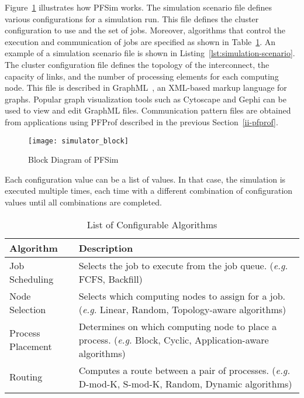 Figure~\ref{fig:simulator-block} illustrates how PFSim works. The
simulation scenario file defines various configurations for a simulation
run. This file defines the cluster configuration to use and the set of
jobs. Moreover, algorithms that control the execution and communication
of jobs are specified as shown in Table~\ref{tbl:simulator-algorithm}.
An example of a simulation scenario file is shown in
Listing~\ref{lst:simulation-scenario}. The cluster configuration file
defines the topology of the interconnect, the capacity of links, and the
number of processing elements for each computing node. This file is
described in GraphML~\autocite{Brandes2013}, an XML-based markup
language for graphs. Popular graph visualization tools such as Cytoscape
and Gephi can be used to view and edit GraphML files. Communication
pattern files are obtained from applications using PFProf described in
the previous Section~\ref{ii-pfprof}.

\begin{figure}
    \centering
    \texttt{[image: simulator\_block]}
    \caption{Block Diagram of PFSim}%
    \label{fig:simulator-block}
\end{figure}

Each configuration value can be a list of values. In that case, the
simulation is executed multiple times, each time with a different
combination of configuration values until all combinations are
completed.

\begin{table}
    \centering
    \normalsize
    \caption{List of Configurable Algorithms}
    \label{tbl:simulator-algorithm}
    \begin{tabularx}{\linewidth}{lX}
        \hline
        Algorithm         & Description                                                 \\
        \hline \hline
        Job Scheduling    & Selects the job to execute from the job queue.
                            (\emph{e.g.} FCFS, Backfill)                                \\ \hline
        Node Selection    & Selects which computing nodes to assign for a job.
                            (\emph{e.g.} Linear, Random, Topology-aware algorithms)     \\ \hline
        Process Placement & Determines on which computing node to place a process.
                            (\emph{e.g.} Block, Cyclic, Application-aware algorithms)   \\ \hline
        Routing           & Computes a route between a pair of processes.
                            (\emph{e.g.} D-mod-K, S-mod-K, Random, Dynamic algorithms)  \\ \hline
    \end{tabularx}
\end{table}

